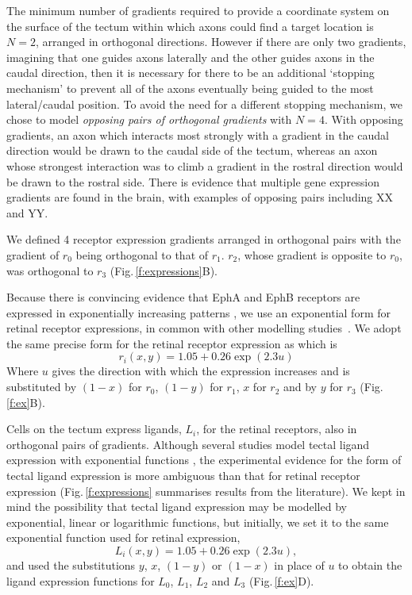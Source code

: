 \documentclass[11pt, a4paper]{article}
\begin{document}
The minimum number of gradients required to provide a coordinate system on the
surface of the tectum within which axons could find a target location is
$N=2$, arranged in orthogonal directions. However if there are only two
gradients, imagining that one guides axons laterally and the other guides
axons in the caudal direction, then it is necessary for there to be an
additional `stopping mechanism' to prevent all of the axons eventually being
guided to the most lateral/caudal position. To avoid the need for a different
stopping mechanism, we chose to model \emph{opposing pairs of orthogonal
gradients} with $N=4$. With opposing gradients, an axon which interacts most
strongly with a gradient in the caudal direction would be drawn to the caudal
side of the tectum, whereas an axon whose strongest interaction was to climb a
gradient in the rostral direction would be drawn to the rostral side. There is
evidence that multiple gene expression gradients are found in the brain, with
examples of opposing pairs including XX and YY.

We defined 4 receptor expression gradients arranged in orthogonal pairs
with the gradient of $r_0$ being orthogonal to that of $r_1$. $r_2$, whose
gradient is opposite to $r_0$, was orthogonal to $r_3$ (Fig.\,\ref{f:expressions}B).

Because there is convincing evidence that EphA and EphB receptors are
expressed in exponentially increasing
patterns \citep{reber_relative_2004,feldheim_genetic_2000,brown_topographic_2000,koulakov_stochastic_2004},
we use an exponential form for retinal receptor expressions, in common with
other modelling
studies~\citep{reber_relative_2004,koulakov_stochastic_2004,simpson_simple_2011}.
We adopt the same precise form for the retinal receptor expression
as \citet{simpson_simple_2011} which is
\begin{equation} \label{e:retrcpt}
r_i(x,y) = 1.05 + 0.26 \exp(2.3 u)
\end{equation}
Where $u$ gives the direction with which the expression increases and is
substituted by $(1-x)$ for $r_0$, $(1-y)$ for $r_1$, $x$ for $r_2$ and by $y$ for
$r_3$ (Fig.\,\ref{f:ex}B).

Cells on the tectum express ligands, $L_i$, for the retinal receptors, also in
orthogonal pairs of gradients. Although several studies model tectal ligand
expression with exponential functions \citep{koulakov_stochastic_2004}, the
experimental evidence for the form of tectal ligand expression is more ambiguous than that for
retinal receptor expression (Fig.\,\ref{f:expressions} summarises results from
the literature). We kept in mind the
possibility that tectal ligand expression may be modelled by exponential,
linear or logarithmic functions, but initially, we set it to the same
exponential function used for retinal expression,
\begin{equation} \label{e:tecligexp}
L_i(x,y) = 1.05 + 0.26 \exp(2.3 u),
\end{equation}
and used the substitutions $y$, $x$, $(1-y)$ or $(1-x)$ in place of $u$ to obtain
the ligand expression functions for $L_0$, $L_1$, $L_2$ and $L_3$
(Fig.\,\ref{f:ex}D).
\end{document}
